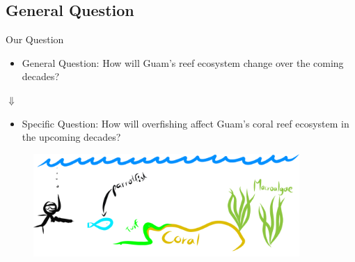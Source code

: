 \documentclass{beamer}
\begin{document}
\subsection{General Question}
\begin{frame}{Our Question}
\begin{itemize}
    \item General Question: How will Guam's reef ecosystem change over the coming decades?
\end{itemize}
\begin{center}
    $\Downarrow$
\end{center}
\begin{itemize}
    \item Specific Question: How will overfishing affect Guam's coral reef ecosystem in the upcoming decades?
\end{itemize}
\begin{figure}
    \centering
    \includegraphics[width=0.9\textwidth]{Latex/Figures/figure1.png}
\end{figure}
\end{frame}
\end{document}
